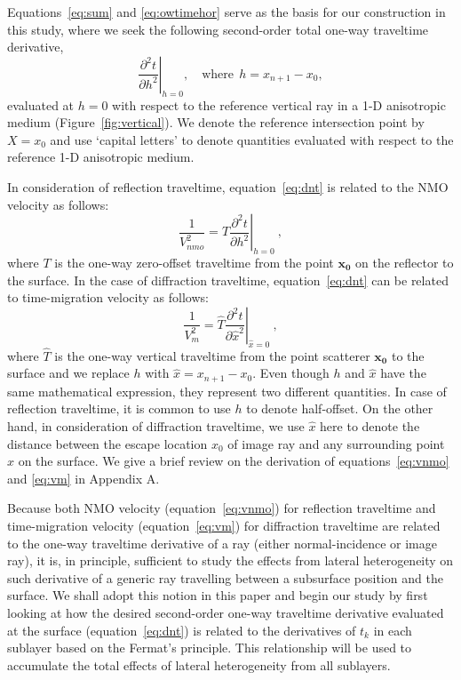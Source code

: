 Equations~\ref{eq:sum} and \ref{eq:owtimehor} serve as the basis for our construction in this study, where we seek the following second-order total one-way traveltime derivative,
\begin{equation}
\label{eq:dnt}
\left.\frac{\partial^2 t}{\partial h^2}\right\rvert_{h=0},\quad\mbox{where}~~h= x_{n+1}-x_0,
\end{equation}
evaluated at $h=0$ with respect to the reference vertical ray in a 1-D anisotropic medium (Figure~\ref{fig:vertical}). We denote the reference intersection point by $X=x_0$ and use `capital letters' to denote quantities evaluated with respect to the reference 1-D anisotropic medium.

In consideration of reflection traveltime, equation~\ref{eq:dnt} is related to the NMO velocity as follows:
\begin{equation}
\label{eq:vnmo}
\frac{1}{V^2_{nmo}} = T \left.\frac{\partial^2 t}{\partial h^2 }\right\rvert_{h=0}~,
\end{equation}
where $T$ is the one-way zero-offset traveltime from the point $\mathbf{x_0}$ on the reflector to the surface. In the case of diffraction traveltime, equation~\ref{eq:dnt} can be related to time-migration velocity as follows:
\begin{equation}
\label{eq:vm}
\frac{1}{V^2_{m}} = \hat{T} \left.\frac{\partial^2 t}{\partial \hat{x}^2}\right\rvert_{\hat{x}=0} ~,
\end{equation}
where $\hat{T}$ is the one-way vertical traveltime from the point scatterer $\mathbf{x_0}$ to the surface and we replace $h$ with $\hat{x} = x_{n+1}-x_0$. Even though $h$ and $\hat{x}$ have the same mathematical expression, they represent two different quantities. In case of reflection traveltime, it is common to use $h$ to denote half-offset. On the other hand, in consideration of diffraction traveltime, we use $\hat{x}$ here to denote the distance between the escape location $x_0$ of image ray and any surrounding point $x$ on the surface. We give a brief review on the derivation of equations~\ref{eq:vnmo} and \ref{eq:vm} in Appendix A.

Because both NMO velocity (equation~\ref{eq:vnmo}) for reflection traveltime and time-migration velocity (equation~\ref{eq:vm}) for diffraction traveltime are related to the one-way traveltime derivative of a ray (either normal-incidence or image ray), it is, in principle, sufficient to study the effects from lateral heterogeneity on such derivative of a generic ray travelling between a subsurface position and the surface. We shall adopt this notion in this paper and begin our study by first looking at how the desired second-order one-way traveltime derivative evaluated at the surface (equation~\ref{eq:dnt}) is related to the derivatives of $t_k$ in each sublayer based on the Fermat's principle. This relationship will be used to accumulate the total effects of lateral heterogeneity from all sublayers.


